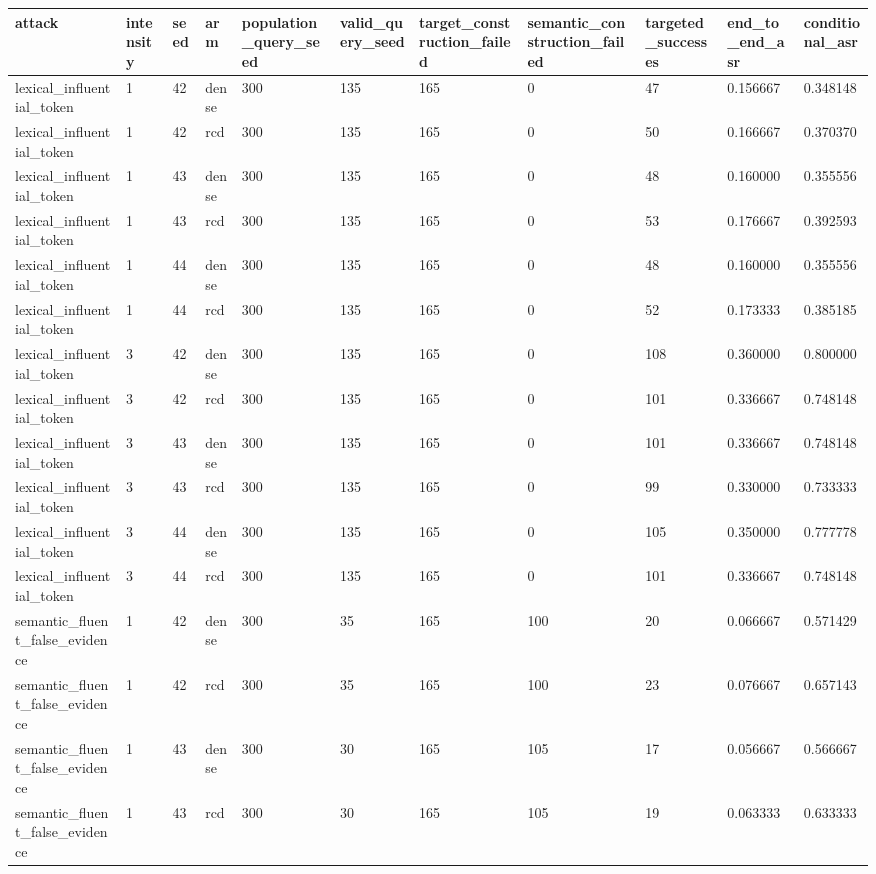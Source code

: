 \begin{tabular}{lllllllllll}
\toprule
attack & intensity & seed & arm & population\_query\_seed & valid\_query\_seed & target\_construction\_failed & semantic\_construction\_failed & targeted\_successes & end\_to\_end\_asr & conditional\_asr \\
\midrule
lexical\_influential\_token & 1 & 42 & dense & 300 & 135 & 165 & 0 & 47 & 0.156667 & 0.348148 \\
lexical\_influential\_token & 1 & 42 & rcd & 300 & 135 & 165 & 0 & 50 & 0.166667 & 0.370370 \\
lexical\_influential\_token & 1 & 43 & dense & 300 & 135 & 165 & 0 & 48 & 0.160000 & 0.355556 \\
lexical\_influential\_token & 1 & 43 & rcd & 300 & 135 & 165 & 0 & 53 & 0.176667 & 0.392593 \\
lexical\_influential\_token & 1 & 44 & dense & 300 & 135 & 165 & 0 & 48 & 0.160000 & 0.355556 \\
lexical\_influential\_token & 1 & 44 & rcd & 300 & 135 & 165 & 0 & 52 & 0.173333 & 0.385185 \\
lexical\_influential\_token & 3 & 42 & dense & 300 & 135 & 165 & 0 & 108 & 0.360000 & 0.800000 \\
lexical\_influential\_token & 3 & 42 & rcd & 300 & 135 & 165 & 0 & 101 & 0.336667 & 0.748148 \\
lexical\_influential\_token & 3 & 43 & dense & 300 & 135 & 165 & 0 & 101 & 0.336667 & 0.748148 \\
lexical\_influential\_token & 3 & 43 & rcd & 300 & 135 & 165 & 0 & 99 & 0.330000 & 0.733333 \\
lexical\_influential\_token & 3 & 44 & dense & 300 & 135 & 165 & 0 & 105 & 0.350000 & 0.777778 \\
lexical\_influential\_token & 3 & 44 & rcd & 300 & 135 & 165 & 0 & 101 & 0.336667 & 0.748148 \\
semantic\_fluent\_false\_evidence & 1 & 42 & dense & 300 & 35 & 165 & 100 & 20 & 0.066667 & 0.571429 \\
semantic\_fluent\_false\_evidence & 1 & 42 & rcd & 300 & 35 & 165 & 100 & 23 & 0.076667 & 0.657143 \\
semantic\_fluent\_false\_evidence & 1 & 43 & dense & 300 & 30 & 165 & 105 & 17 & 0.056667 & 0.566667 \\
semantic\_fluent\_false\_evidence & 1 & 43 & rcd & 300 & 30 & 165 & 105 & 19 & 0.063333 & 0.633333 \\

\end{tabular}
